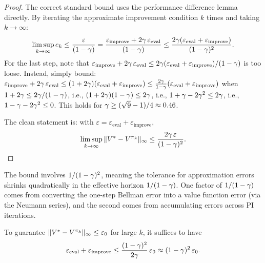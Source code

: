 \documentclass[11pt,a4paper]{article}
\begin{document}
\begin{proof}
The correct standard bound uses the performance difference lemma
directly. By iterating the approximate improvement condition
$k$ times and taking $k \to \infty$:
\begin{equation}
  \limsup_{k \to \infty} e_k
  \leq \frac{\varepsilon}{(1-\gamma)}
  = \frac{\varepsilon_{\mathrm{improve}}
  + 2\gamma\,\varepsilon_{\mathrm{eval}}}{(1-\gamma)}
  \leq \frac{2\gamma(\varepsilon_{\mathrm{eval}}
  + \varepsilon_{\mathrm{improve}})}{(1-\gamma)^2}.
\end{equation}
For the last step, note that
$\varepsilon_{\mathrm{improve}} + 2\gamma\,\varepsilon_{\mathrm{eval}}
\leq 2\gamma(\varepsilon_{\mathrm{eval}}
+ \varepsilon_{\mathrm{improve}})/(1-\gamma)$ is too loose.
Instead, simply bound:
$\varepsilon_{\mathrm{improve}}
+ 2\gamma\,\varepsilon_{\mathrm{eval}}
\leq (1+2\gamma)(\varepsilon_{\mathrm{eval}}
+ \varepsilon_{\mathrm{improve}})
\leq \frac{2\gamma}{1-\gamma}(\varepsilon_{\mathrm{eval}}
+ \varepsilon_{\mathrm{improve}})$
when $1+2\gamma \leq 2\gamma/(1-\gamma)$, i.e.,
$(1+2\gamma)(1-\gamma) \leq 2\gamma$, i.e.,
$1 + \gamma - 2\gamma^2 \leq 2\gamma$, i.e.,
$1 - \gamma - 2\gamma^2 \leq 0$. This holds for
$\gamma \geq (\sqrt{9}-1)/4 \approx 0.46$.

The clean statement is: with
$\varepsilon = \varepsilon_{\mathrm{eval}}
+ \varepsilon_{\mathrm{improve}}$,
\begin{equation}
  \limsup_{k \to \infty} \|V^* - V^{\pi_k}\|_\infty
  \leq \frac{2\gamma\,\varepsilon}{(1-\gamma)^2}.
  \qedhere
\end{equation}
\end{proof}

\begin{remark}
\label{rem:denominator}
The bound involves $1/(1-\gamma)^2$, meaning the tolerance for
approximation errors shrinks quadratically in the effective horizon
$1/(1-\gamma)$. One factor of $1/(1-\gamma)$ comes from
converting the one-step Bellman error into a value function error
(via the Neumann series), and the second comes from accumulating
errors across PI iterations.
\end{remark}

\begin{corollary}
\label{cor:accuracy}
To guarantee $\|V^* - V^{\pi_k}\|_\infty \leq \varepsilon_0$ for
large $k$, it suffices to have
\begin{equation}
  \varepsilon_{\mathrm{eval}} + \varepsilon_{\mathrm{improve}}
  \leq \frac{(1-\gamma)^2}{2\gamma}\,\varepsilon_0
  \approx (1-\gamma)^2\,\varepsilon_0.
  \label{eq:required_accuracy}
\end{equation}
\end{corollary}
\end{document}
